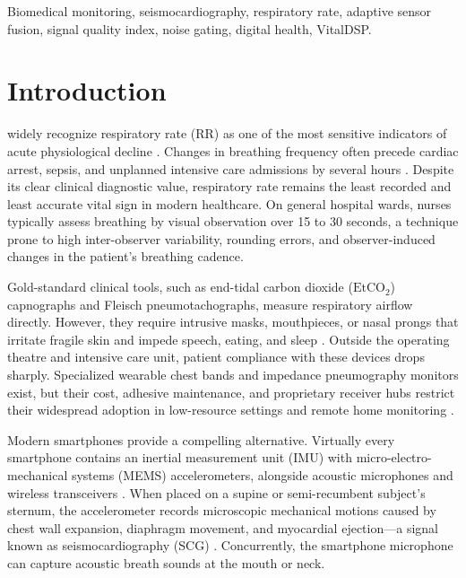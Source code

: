 \documentclass[journal,10pt,twocolumn]{IEEEtran}
\begin{document}
\begin{IEEEkeywords}
Biomedical monitoring, seismocardiography, respiratory rate, adaptive sensor fusion, signal quality index, noise gating, digital health, VitalDSP.
\end{IEEEkeywords}

\section{Introduction}
 widely recognize respiratory rate (RR) as one of the most sensitive indicators of acute physiological decline \cite{cretikos2008respiratory}. Changes in breathing frequency often precede cardiac arrest, sepsis, and unplanned intensive care admissions by several hours \cite{subbe2001validation}. Despite its clear clinical diagnostic value, respiratory rate remains the least recorded and least accurate vital sign in modern healthcare. On general hospital wards, nurses typically assess breathing by visual observation over 15 to 30 seconds, a technique prone to high inter-observer variability, rounding errors, and observer-induced changes in the patient's breathing cadence.

Gold-standard clinical tools, such as end-tidal carbon dioxide ($\text{EtCO}_2$) capnographs and Fleisch pneumotachographs, measure respiratory airflow directly. However, they require intrusive masks, mouthpieces, or nasal prongs that irritate fragile skin and impede speech, eating, and sleep \cite{folke2003critical}. Outside the operating theatre and intensive care unit, patient compliance with these devices drops sharply. Specialized wearable chest bands and impedance pneumography monitors exist, but their cost, adhesive maintenance, and proprietary receiver hubs restrict their widespread adoption in low-resource settings and remote home monitoring \cite{charlton2018breathing}.

Modern smartphones provide a compelling alternative. Virtually every smartphone contains an inertial measurement unit (IMU) with micro-electro-mechanical systems (MEMS) accelerometers, alongside acoustic microphones and wireless transceivers \cite{inviolata2021seismocardiography}. When placed on a supine or semi-recumbent subject's sternum, the accelerometer records microscopic mechanical motions caused by chest wall expansion, diaphragm movement, and myocardial ejection—a signal known as seismocardiography (SCG) \cite{taebi2019scg}. Concurrently, the smartphone microphone can capture acoustic breath sounds at the mouth or neck.
\end{document}
